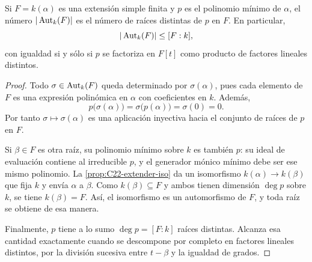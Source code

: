 \begin{coro}\label{coro:C22-automorfismos}
Si $F=k(\alpha)$ es una extensión simple finita y $p$ es el polinomio mínimo de $\alpha$, el número $|\operatorname{Aut}_k(F)|$ es el número de raíces distintas de $p$ en $F$. En particular,
\[
|\operatorname{Aut}_k(F)|\leq[F:k],
\]
con igualdad si y sólo si $p$ se factoriza en $F[t]$ como producto de factores lineales distintos.
\end{coro}
\begin{proof}
Todo $\sigma\in\operatorname{Aut}_k(F)$ queda determinado por $\sigma(\alpha)$, pues cada elemento de $F$ es una expresión polinómica en $\alpha$ con coeficientes en $k$. Además,
\[
p\bigl(\sigma(\alpha)\bigr)=\sigma\bigl(p(\alpha)\bigr)=\sigma(0)=0.
\]
Por tanto $\sigma\mapsto\sigma(\alpha)$ es una aplicación inyectiva hacia el conjunto de raíces de $p$ en $F$.

Si $\beta\in F$ es otra raíz, su polinomio mínimo sobre $k$ es también $p$: su ideal de evaluación contiene al irreducible $p$, y el generador mónico mínimo debe ser ese mismo polinomio. La \cref{prop:C22-extender-iso} da un isomorfismo $k(\alpha)\to k(\beta)$ que fija $k$ y envía $\alpha$ a $\beta$. Como $k(\beta)\subseteq F$ y ambos tienen dimensión $\deg p$ sobre $k$, se tiene $k(\beta)=F$. Así, el isomorfismo es un automorfismo de $F$, y toda raíz se obtiene de esa manera.

Finalmente, $p$ tiene a lo sumo $\deg p=[F:k]$ raíces distintas. Alcanza esa cantidad exactamente cuando se descompone por completo en factores lineales distintos, por la división sucesiva entre $t-\beta$ y la igualdad de grados.
\end{proof}
